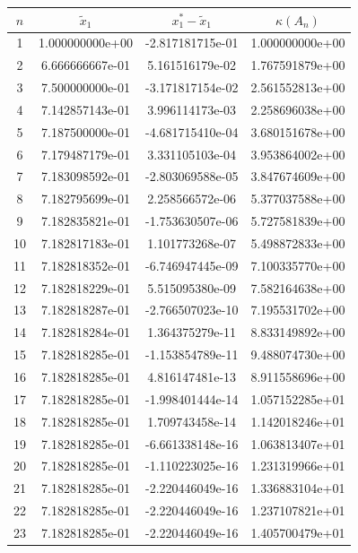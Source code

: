 \documentclass{article}
\begin{document}
\begin{table}[htb]
\centering %
\begin{tabular}{c c c c} %
$n$ & $\widetilde{x}_1$ & $x_1^{\ast}- \widetilde{x}_1$ & $\kappa(A_n)$ \\ [0.65ex] %
\hline %
1 & 1.000000000e+00 & -2.817181715e-01 & 1.000000000e+00 \\
2 & 6.666666667e-01 & 5.161516179e-02 & 1.767591879e+00 \\
3 & 7.500000000e-01 & -3.171817154e-02 & 2.561552813e+00 \\
4 & 7.142857143e-01 & 3.996114173e-03 & 2.258696038e+00 \\
5 & 7.187500000e-01 & -4.681715410e-04 & 3.680151678e+00 \\
6 & 7.179487179e-01 & 3.331105103e-04 & 3.953864002e+00 \\
7 & 7.183098592e-01 & -2.803069588e-05 & 3.847674609e+00 \\
8 & 7.182795699e-01 & 2.258566572e-06 & 5.377037588e+00 \\
9 & 7.182835821e-01 & -1.753630507e-06 & 5.727581839e+00 \\
10 & 7.182817183e-01 & 1.101773268e-07 & 5.498872833e+00 \\
11 & 7.182818352e-01 & -6.746947445e-09 & 7.100335770e+00 \\
12 & 7.182818229e-01 & 5.515095380e-09 & 7.582164638e+00 \\
13 & 7.182818287e-01 & -2.766507023e-10 & 7.195531702e+00 \\
14 & 7.182818284e-01 & 1.364375279e-11 & 8.833149892e+00 \\
15 & 7.182818285e-01 & -1.153854789e-11 & 9.488074730e+00 \\
16 & 7.182818285e-01 & 4.816147481e-13 & 8.911558696e+00 \\
17 & 7.182818285e-01 & -1.998401444e-14 & 1.057152285e+01 \\
18 & 7.182818285e-01 & 1.709743458e-14 & 1.142018246e+01 \\
19 & 7.182818285e-01 & -6.661338148e-16 & 1.063813407e+01 \\
20 & 7.182818285e-01 & -1.110223025e-16 & 1.231319966e+01 \\
21 & 7.182818285e-01 & -2.220446049e-16 & 1.336883104e+01 \\
22 & 7.182818285e-01 & -2.220446049e-16 & 1.237107821e+01 \\
23 & 7.182818285e-01 & -2.220446049e-16 & 1.405700479e+01 \\

\end{tabular}
\end{table}
\end{document}
